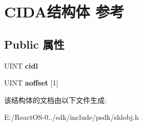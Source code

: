 \hypertarget{struct_c_i_d_a}{}\section{C\+I\+D\+A结构体 参考}
\label{struct_c_i_d_a}
\subsection*{Public 属性}
\begin{DoxyCompactItemize}
\item 
\mbox{\label{struct_c_i_d_a_abcc2cf7a69eab5f0d2b60378797eb254}} 
U\+I\+NT {\bfseries cidl}
\item 
\mbox{\label{struct_c_i_d_a_a8fd3690ab1cd1709d2eb723bbb22e352}} 
U\+I\+NT {\bfseries aoffset} \mbox{[}1\mbox{]}
\end{DoxyCompactItemize}


该结构体的文档由以下文件生成\+:\begin{DoxyCompactItemize}
\item 
E\+:/\+React\+O\+S-\/0../sdk/include/psdk/shlobj.\+h\end{DoxyCompactItemize}
